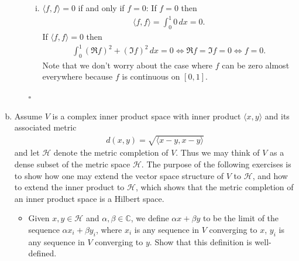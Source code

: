 \documentclass[11pt]{article}
\begin{document}
\begin{enumerate}[(a)]
\begin{itemize}
\begin{enumerate}[(i)]
			
			
			
			\item $\langle f,f \rangle = 0$ if and only if $f=0$: If $f =0$ then 
			\begin{align*}
			\langle f,f\rangle = \int^1_0 0\,dx= 0.
			\end{align*}
			If $\langle f,f\rangle = 0$ then 
			\begin{align*}
			\int^1_0 \left(\Re{f}\right)^2 + \left(\Im{f}\right)^2\,dx = 0 \iff \Re{f} = \Im{f} = 0 \iff f=0.
			\end{align*}
		Note that we don't worry about the case where $f$ can be zero almost everywhere because $f$ is continuous on $[0,1]$. 
		 
		\end{enumerate}
		\hfill$\square$ 	

	
	

	 
		
	
	\end{itemize}  
	
	
	
	\newpage
	
	
	
	
	
	\item Assume $V$ is a complex inner product space with inner product $\langle x,y \rangle$ and its associated metric
	\begin{align*}
	d(x,y) = \sqrt{\langle x-y,x-y \rangle}
	\end{align*}
	and let $\mathcal{H}$ denote the metric completion of $V$. Thus we may think of $V$ as a dense subset of the metric space $\mathcal{H}$. The purpose of the following exercises is to show how one may extend the vector space structure of $V$ to $\mathcal{H}$, and how to extend the inner product to $\mathcal{H}$, which shows that the metric completion of an inner product space is a Hilbert space. 
	
	
	\begin{itemize}
		\item Given $x,y\in \mathcal{H}$ and $\alpha,\beta \in \mathbb{C}$, we define $\alpha x + \beta y$ to be the limit of the sequence $\alpha x_i + \beta y_i$, where $x_i$ is any sequence in $V$ converging to $x$, $y_i$ is any sequence in $V$ converging to $y$. Show that this definition is well-defined. 
		

\end{itemize}
\end{enumerate}
\end{document}
